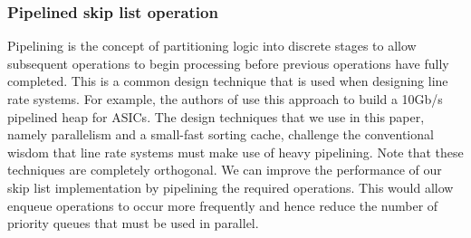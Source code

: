 

\subsubsection*{Pipelined skip list operation}
Pipelining is the concept of partitioning logic into discrete stages to allow subsequent operations to begin processing before previous operations have fully completed. This is a common design technique that is used when designing line rate systems. For example, the authors of \cite{pipelined-heap-2007} use this approach to build a 10Gb/s pipelined heap for ASICs. The design techniques that we use in this paper, namely parallelism and a small-fast sorting cache, challenge the conventional wisdom that line rate systems must make use of heavy pipelining. Note that these techniques are completely orthogonal. We can improve the performance of our skip list implementation by pipelining the required operations. This would allow enqueue operations to occur more frequently and hence reduce the number of priority queues that must be used in parallel.

